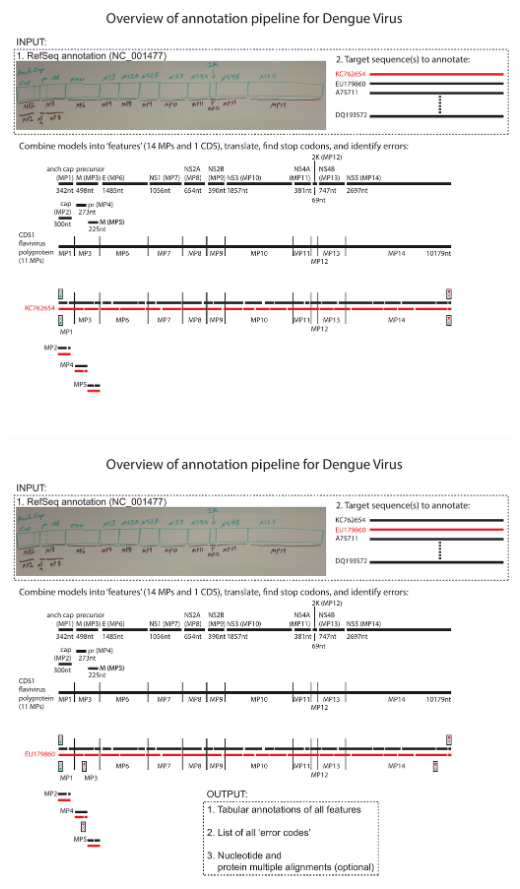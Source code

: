 \documentclass[landscape]{slides}
\begin{document}
\begin{slide}
\begin{center}
\includegraphics[width=10in]{figs/annotation-schematic-dengue-3}
\end{center}
\vfill
\end{slide}
\begin{slide}
\begin{center}
\includegraphics[width=10in]{figs/annotation-schematic-dengue-4-with-output}
\end{center}
\vfill
\end{slide}
\end{document}
